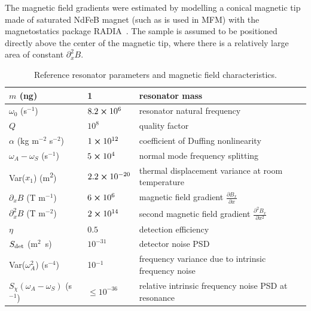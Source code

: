 The magnetic field gradients were estimated by modelling a conical magnetic tip made of saturated NdFeB  magnet (such as is used in MFM) with the magnetostatics package RADIA~\cite{Chubar_1998}. The sample is assumed to be positioned directly above the center of the magnetic tip, where there is a relatively large area of constant $\partial^2_x B$. 

	\begin{center}
		\begin{table} [h!]
			\caption{Reference resonator parameters and magnetic field characteristics.}
			\label{table:spins_params}
			\def\arraystretch{1.3}
			\begin{tabular}{|  m{2.8cm} |  m{1.9cm} | m{4.8cm} |}
				\hline
				$m$ (ng) & 1 & resonator mass  \\ 
				\hline
				$\omega_0$ (s$^{-1}$)& $8.2 \cross 10^6$ & resonator natural frequency\\ 
				\hline
				$Q$ & $10^8$ & quality factor  \\
				\hline
				$\alpha$ (kg m$^{-2}$ s$^{-2}$) & $1 \cross 10^{12}$ & coefficient of Duffing nonlinearity \\
				\hline
				$\omega_A - \omega_S$ (s$^{-1}$) & $5 \cross 10^4$ & normal mode frequency splitting\\
				\hline
				Var($x_1$) (m\textsuperscript{2}) & $2.2 \cross 10^{-20}$ &  thermal displacement variance at room temperature \\
				
				\hline
				$\partial_x B$ (T m$^{-1}$) & $6 \cross 10^{6}$ & magnetic field gradient $\frac{\partial B_x}{\partial x}$\\
				\hline
				$\partial_x^2 B$ (T m$^{-2}$) & $2 \cross 10^{14}$ & second magnetic field gradient $\frac{\partial^2 B_x}{\partial x^2}$ \\
				\hline
				$\eta$ & $0.5$ & detection efficiency \\
				\hline
				$S_{\rm det}$ (m$^2$~s) & $10^{-31}$ & detector noise PSD \\
				\hline
				Var($\omega_A^2$) (s$^{-4}$) & 10$^{-1}$ & frequency variance due to intrinsic frequency noise\\
				\hline
				$S_\chi(\omega_A -\omega_S )$ (s$^{-1}$) & $\leq 10^{-36} $ & relative intrinsic frequency noise PSD at resonance \\
				\hline
			\end{tabular}
		\end{table}
	\end{center}
